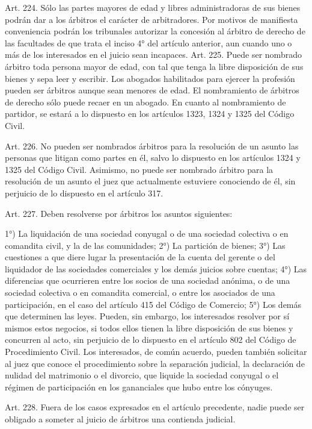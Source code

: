     Art. 224. Sólo las partes mayores de edad y libres administradoras de sus bienes podrán dar a los árbitros el carácter de arbitradores. Por motivos de manifiesta conveniencia podrán los tribunales autorizar la concesión al árbitro de derecho de las facultades de que trata el inciso 4° del artículo anterior, aun cuando uno o más de los interesados en el juicio sean incapaces.
    Art. 225. Puede ser nombrado árbitro toda persona mayor de edad, con tal que tenga la libre disposición de sus bienes y sepa leer y escribir. Los abogados habilitados para ejercer la profesión pueden ser árbitros aunque sean menores de edad.
    El nombramiento de árbitros de derecho sólo puede recaer en un abogado.
    En cuanto al nombramiento de partidor, se estará a lo dispuesto en los artículos 1323, 1324 y 1325 del Código Civil.


    Art. 226. No pueden ser nombrados árbitros para la resolución de un asunto las personas que litigan como partes en él, salvo lo dispuesto en los artículos 1324 y 1325 del Código Civil.
    Asimismo, no puede ser nombrado árbitro para la resolución de un asunto el juez que actualmente estuviere conociendo de él, sin perjuicio de lo dispuesto en el artículo 317.


    Art. 227. Deben resolverse por árbitros los asuntos siguientes:

    1°) La liquidación de una sociedad conyugal o de una sociedad colectiva o en comandita civil, y la de las comunidades;
    2°) La partición de bienes;
    3°) Las cuestiones a que diere lugar la presentación de la cuenta del gerente o del liquidador de las sociedades comerciales y los demás juicios sobre cuentas;
    4°) Las diferencias que ocurrieren entre los socios de una sociedad anónima, o de una sociedad colectiva o en comandita comercial, o entre los asociados de una participación, en el caso del artículo 415 del Código de Comercio;
    5°) Los demás que determinen las leyes.
    Pueden, sin embargo, los interesados resolver por sí mismos estos negocios, si todos ellos tienen la libre disposición de sus bienes y concurren al acto, sin perjuicio de lo dispuesto en el artículo 802 del Código de Procedimiento Civil.
    Los interesados, de común acuerdo, pueden también solicitar al juez que conoce el procedimiento sobre la separación judicial, la declaración de nulidad del matrimonio o el divorcio, que liquide la sociedad conyugal o el régimen de participación en los gananciales que hubo entre los cónyuges.


    Art. 228. Fuera de los casos expresados en el artículo precedente, nadie puede ser obligado a someter al juicio de árbitros una contienda judicial.



